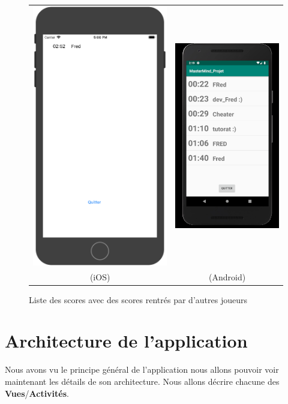 \documentclass{article}
\begin{document}
\begin{itemize}
\begin{figure}[tb!]
    \centering
    \begin{tabular}{cc}
      \includegraphics[width=.3\linewidth]{./img/mastermind_liste_ios.png} &
      \includegraphics[width=.3\linewidth]{./img/mastermind_liste_android.png} \\
      (iOS) & (Android)\\
    \end{tabular}
    \caption{Liste des scores avec des scores rentrés par d'autres joueurs \label{fig:liste}}
\end{figure}

\end{itemize}

\section{Architecture de l'application}

Nous avons vu le principe général de l'application nous allons pouvoir voir maintenant les détails de son architecture. Nous allons décrire chacune des \textbf{Vues}/\textbf{Activités}. 
\end{document}
